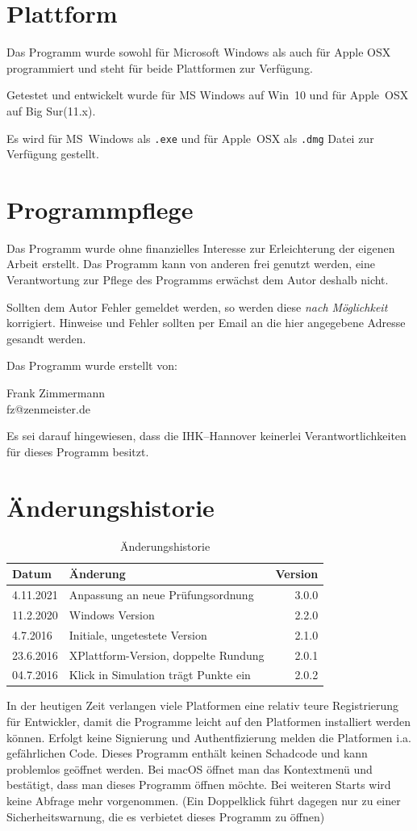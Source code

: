 \documentclass[a4paper,notitlepage,parskip=half]{scrartcl}
\begin{document}
\section{Plattform}
Das Programm wurde sowohl für Microsoft Windows als auch für Apple OSX programmiert und steht für beide Plattformen zur Verfügung.

Getestet und entwickelt wurde für MS Windows auf Win~10 und für Apple~OSX auf Big Sur(11.x).

Es wird für MS~Windows als \texttt{.exe} und für Apple~OSX als \texttt{.dmg} Datei zur Verfügung gestellt. 

\section{Programmpflege}
Das Programm wurde ohne finanzielles Interesse zur Erleichterung der eigenen Arbeit erstellt.
Das Programm kann von anderen frei genutzt werden, eine Verantwortung zur Pflege des Programms erwächst dem Autor deshalb nicht.

Sollten dem Autor Fehler gemeldet werden, so werden diese \emph{nach Möglichkeit} korrigiert. Hinweise und Fehler sollten per Email an die hier angegebene Adresse gesandt werden.

Das Programm wurde erstellt von:

Frank Zimmermann\\
fz@zenmeister.de

Es sei darauf hingewiesen, dass die IHK--Hannover keinerlei Verantwortlichkeiten für dieses Programm besitzt.
\section{Änderungshistorie}
\begin{table}[H]\centering
\begin{tabular}{|l|l|r|}
\hline
Datum & Änderung &Version\\
\hline
4.11.2021&	Anpassung an neue Prüfungsordnung	&  3.0.0\\
11.2.2020&	Windows Version						&  2.2.0\\
4.7.2016&	Initiale, ungetestete Version		&  2.1.0\\
23.6.2016&	XPlattform-Version, doppelte Rundung&  2.0.1\\
04.7.2016&	Klick in Simulation trägt Punkte ein&  2.0.2\\
\hline
\end{tabular}
\caption{Änderungshistorie}
\end{table}

\begin{marker}
In der heutigen Zeit verlangen viele Platformen eine relativ teure Registrierung für Entwickler, damit die Programme leicht auf den Platformen installiert werden können. Erfolgt keine Signierung und Authentfizierung melden die Platformen i.a. gefährlichen Code. Dieses Programm enthält keinen Schadcode und kann problemlos geöffnet werden. Bei macOS öffnet man das Kontextmenü und bestätigt, dass man dieses Programm öffnen möchte.
Bei weiteren Starts wird keine Abfrage mehr vorgenommen. (Ein Doppelklick führt dagegen nur zu einer Sicherheitswarnung, die es verbietet dieses Programm zu öffnen)
\end{marker}
\end{document}
